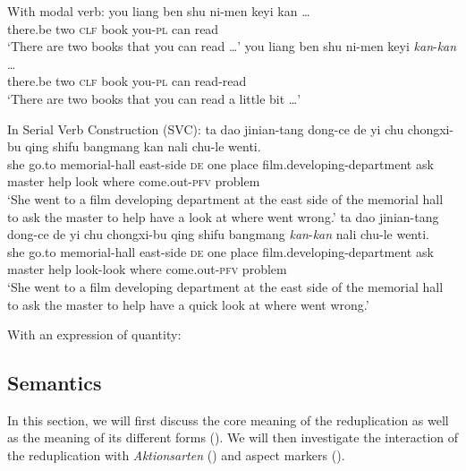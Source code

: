 \begin{sloppypar}
\ex With modal verb:
		\ea \gll you liang ben shu ni-men keyi kan \ldots\\
		there.be two \textsc{clf} book you-\textsc{pl} can read\\
		\glt `There are two books that you can read \ldots'
		\ex \gll you liang ben shu ni-men keyi \textit{kan}-\textit{kan} \ldots\\
		there.be two \textsc{clf} book you-\textsc{pl} can read-read\\ 
		\glt `There are two books that you can read a little bit \ldots'
		\z

\ex\label{ex:syn-svc} In Serial Verb Construction (SVC):
		\ea \gll ta dao jinian-tang dong-ce de yi chu chongxi-bu qing shifu bangmang kan nali chu-le wenti.\\
		she go.to memorial-hall east-side \textsc{de} one place film.developing-department ask master help look where come.out-\textsc{pfv} problem\\
		\glt `She went to a film developing department at the east side of the memorial hall to ask the master to help have a look at where went wrong.'
		\ex \gll ta dao jinian-tang dong-ce de yi chu chongxi-bu qing shifu bangmang \textit{kan}-\textit{kan} nali chu-le wenti.\\
		she go.to memorial-hall east-side \textsc{de} one place film.developing-department ask master help look-look where come.out-\textsc{pfv} problem\\ 
		\glt `She went to a film developing department at the east side of the memorial hall to ask the master to help have a quick look at where went wrong.'
		\z

\ex With an expression of quantity: \label{ex:syn-quan}
		\z
\z
\end{sloppypar}




\subsection{Semantics}\label{sec:sem}

In this section, we will first discuss the core meaning of the reduplication as well as the meaning of its different forms ().
We will then investigate the interaction of the reduplication with \textit{Aktionsarten} () and aspect markers ().

